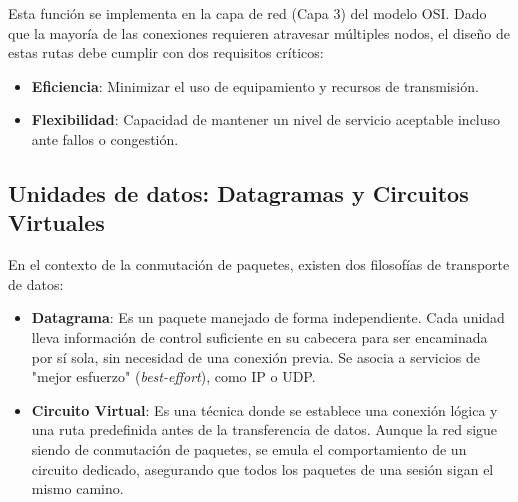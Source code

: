 Esta función se implementa en la capa de red (Capa 3) del modelo OSI. Dado que la mayoría de las conexiones requieren atravesar múltiples nodos, el diseño de estas rutas debe cumplir con dos requisitos críticos:

\begin{itemize}
	\item \textbf{Eficiencia}: Minimizar el uso de equipamiento y recursos de transmisión.
	\item \textbf{Flexibilidad}: Capacidad de mantener un nivel de servicio aceptable incluso ante fallos o congestión.
\end{itemize}

\subsection{Unidades de datos: Datagramas y Circuitos Virtuales}

En el contexto de la conmutación de paquetes, existen dos filosofías de transporte de datos:

\begin{itemize}
    \item \textbf{Datagrama}: Es un paquete manejado de forma independiente. Cada unidad lleva información de control suficiente en su cabecera para ser encaminada por sí sola, sin necesidad de una conexión previa. Se asocia a servicios de "mejor esfuerzo" (\textit{best-effort}), como IP o UDP.
    \item \textbf{Circuito Virtual}: Es una técnica donde se establece una conexión lógica y una ruta predefinida antes de la transferencia de datos. Aunque la red sigue siendo de conmutación de paquetes, se emula el comportamiento de un circuito dedicado, asegurando que todos los paquetes de una sesión sigan el mismo camino.
\end{itemize}